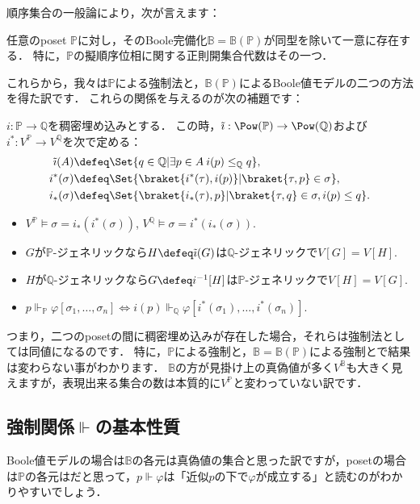 \documentclass[a4j]{ltjsarticle}
\renewcommand{\emph}[1]{\textbf{\textgt{#1}}}
\begin{document}
順序集合の一般論により，次が言えます：

\begin{fact}
 任意のposet $\mathbb{P}$に対し，そのBoole完備化$\mathbb{B} = \mathbb{B}(\mathbb{P})$が同型を除いて一意に存在する．
 特に，$\mathbb{P}$の擬順序位相に関する正則開集合代数はその一つ．
\end{fact}

これらから，我々は$\mathbb{P}$による強制法と，$\mathbb{B}(\mathbb{P})$によるBoole値モデルの二つの方法を得た訳です．
これらの関係を与えるのが次の補題です：

\begin{lemma}
 $i: \mathbb{P} \to \mathbb{Q}$を稠密埋め込みとする．
 この時，$\tilde{\imath}: \Pow(\mathbb{P}) \to \Pow(\mathbb{Q})$および$i^*: V^{\mathbb{P}} \to V^{\mathbb{Q}}$を次で定める：
 \begin{align*}
  \tilde{\imath}(A) &\defeq \Set{q \in \mathbb{Q} | \exists p \in A \: i(p) \leq_{\mathbb{Q}} q},\\
  i^*(\sigma) & \defeq \Set{\braket{i^*(\tau), i(p)} | \braket{\tau, p} \in \sigma},\\
  i_*(\sigma) & \defeq \Set{\braket{i_*(\tau), p} | \braket{\tau, q} \in \sigma, i(p) \leq q}.
 \end{align*}

 \begin{itemize}
  \item $V^{\mathbb{P}} \models \sigma = i_*(i^*(\sigma))$,
        $V^{\mathbb{Q}} \models \sigma = i^*(i_*(\sigma))$.
  \item $G$が$\mathbb{P}$-ジェネリックなら$H \defeq \tilde{\imath}(G)$は$\mathbb{Q}$-ジェネリックで$V[G] = V[H]$.
  \item $H$が$\mathbb{Q}$-ジェネリックなら$G \defeq i^{-1}[H]$は$\mathbb{P}$-ジェネリックで$V[H] = V[G]$.
  \item $p \Vdash_{\mathbb{P}} \varphi[\sigma_1, \dots, \sigma_n] \iff i(p) \Vdash_{\mathbb Q} \varphi[i^*(\sigma_1), \dots, i^*(\sigma_n)]$.
 \end{itemize}
\end{lemma}

つまり，二つのposetの間に稠密埋め込みが存在した場合，それらは強制法としては同値になるのです．
特に，$\mathbb{P}$による強制と，$\mathbb{B} = \mathbb{B}(\mathbb{P})$による強制とで結果は変わらない事がわかります．
$\mathbb{B}$の方が見掛け上の真偽値が多く$V^{\mathbb{B}}$も大きく見えますが，表現出来る集合の数は本質的に$V^{\mathbb{P}}$と変わっていない訳です．

\subsection{強制関係$\Vdash$の基本性質}
Boole値モデルの場合は$\mathbb{B}$の各元は真偽値の集合と思った訳ですが，posetの場合は$\mathbb{P}$の各元は\emph{ジェネリックオブジェクトの近似}だと思って，$p \Vdash \varphi$は「近似$p$の下で$\varphi$が成立する」と読むのがわかりやすいでしょう．
\end{document}

